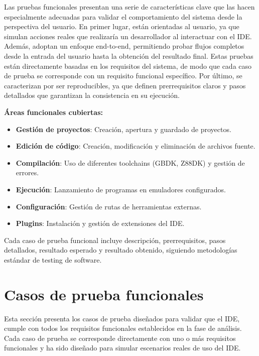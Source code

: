 \documentclass[../../main.tex]{subfiles}
\begin{document}
Las pruebas funcionales presentan una serie de características clave que las hacen especialmente adecuadas para validar el comportamiento del sistema desde la perspectiva del usuario. En primer lugar, están orientadas al usuario, ya que simulan acciones reales que realizaría un desarrollador al interactuar con el IDE. Además, adoptan un enfoque end-to-end, permitiendo probar flujos completos desde la entrada del usuario hasta la obtención del resultado final. Estas pruebas están directamente basadas en los requisitos del sistema, de modo que cada caso de prueba se corresponde con un requisito funcional específico. Por último, se caracterizan por ser reproducibles, ya que definen prerrequisitos claros y pasos detallados que garantizan la consistencia en su ejecución.
    
\clearpage

\textbf{Áreas funcionales cubiertas:} 

\begin{itemize}
    \item \textbf{Gestión de proyectos}: Creación, apertura y guardado de proyectos.
    \item \textbf{Edición de código}: Creación, modificación y eliminación de archivos fuente.
    \item \textbf{Compilación}: Uso de diferentes toolchains (GBDK, Z88DK) y gestión de errores.
    \item \textbf{Ejecución}: Lanzamiento de programas en emuladores configurados.
    \item \textbf{Configuración}: Gestión de rutas de herramientas externas.
    \item \textbf{Plugins}: Instalación y gestión de extensiones del IDE.
\end{itemize}
    
Cada caso de prueba funcional incluye descripción, prerrequisitos, pasos detallados, resultado esperado y resultado obtenido, siguiendo metodologías estándar de testing de software.

\section{Casos de prueba funcionales}

Esta sección presenta los casos de prueba diseñados para validar que el IDE, cumple con todos los requisitos funcionales establecidos en la fase de análisis. Cada caso de prueba se corresponde directamente con uno o más requisitos funcionales y ha sido diseñado para simular escenarios reales de uso del IDE.
\end{document}

